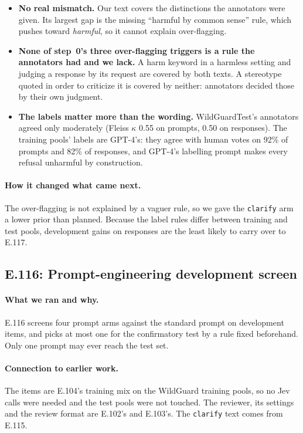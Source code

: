 \documentclass[11pt]{article}
\renewcommand{\_}{\origunderscore\allowbreak}
\begin{document}
\begin{itemize}[leftmargin=*]
  \item \textbf{No real mismatch.} Our text covers the distinctions the annotators were given. Its largest gap is the missing ``harmful by common sense'' rule, which pushes toward \emph{harmful}, so it cannot explain over-flagging.
  \item \textbf{None of step~0's three over-flagging triggers is a rule the annotators had and we lack.} A harm keyword in a harmless setting and judging a response by its request are covered by both texts. A stereotype quoted in order to criticize it is covered by neither: annotators decided those by their own judgment.
  \item \textbf{The labels matter more than the wording.} WildGuardTest's annotators agreed only moderately (Fleiss $\kappa$ 0.55 on prompts, 0.50 on responses). The training pools' labels are GPT-4's: they agree with human votes on 92\% of prompts and 82\% of responses, and GPT-4's labelling prompt makes every refusal unharmful by construction.
\end{itemize}

\paragraph{How it changed what came next.}
The over-flagging is not explained by a vaguer rule, so we gave the \texttt{clarify} arm a lower prior than planned. Because the label rules differ between training and test pools, development gains on responses are the least likely to carry over to E.117.

\subsection{E.116: Prompt-engineering development screen}\label{sec:e116}

\paragraph{What we ran and why.}
E.116 screens four prompt arms against the standard prompt on development items, and picks at most one for the confirmatory test by a rule fixed beforehand. Only one prompt may ever reach the test set.

\paragraph{Connection to earlier work.}
The items are E.104's training mix on the WildGuard training pools, so no Jev calls were needed and the test pools were not touched. The reviewer, its settings and the review format are E.102's and E.103's. The \texttt{clarify} text comes from E.115.
\end{document}
